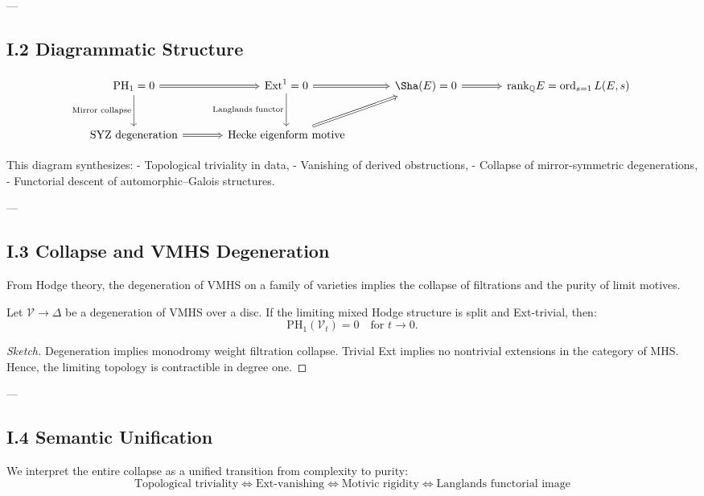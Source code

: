 ---

\subsection*{I.2 Diagrammatic Structure}

\[
\begin{tikzcd}[row sep=large, column sep=large]
\mathrm{PH}_1 = 0 \arrow[r, Rightarrow] \arrow[d, "\text{Mirror collapse}"'] &
\mathrm{Ext}^1 = 0 \arrow[r, Rightarrow] \arrow[d, "\text{Langlands functor}"'] &
\Sha(E) = 0 \arrow[r, Rightarrow] &
\mathrm{rank}_{\mathbb{Q}} E = \operatorname{ord}_{s=1} L(E,s) \\
\text{SYZ degeneration} \arrow[r, Rightarrow] &
\text{Hecke eigenform motive} \arrow[ur, Rightarrow] &
\end{tikzcd}
\]

This diagram synthesizes:
- Topological triviality in data,
- Vanishing of derived obstructions,
- Collapse of mirror-symmetric degenerations,
- Functorial descent of automorphic–Galois structures.

---

\subsection*{I.3 Collapse and VMHS Degeneration}

From Hodge theory, the degeneration of VMHS on a family of varieties  
implies the collapse of filtrations and the purity of limit motives.

\begin{proposition}
Let \( \mathcal{V} \to \Delta \) be a degeneration of VMHS over a disc.  
If the limiting mixed Hodge structure is split and Ext-trivial, then:
\[
\mathrm{PH}_1(\mathcal{V}_t) = 0 \quad \text{for } t \to 0.
\]
\end{proposition}

\begin{proof}[Sketch]
Degeneration implies monodromy weight filtration collapse.  
Trivial Ext implies no nontrivial extensions in the category of MHS.  
Hence, the limiting topology is contractible in degree one.
\end{proof}

---

\subsection*{I.4 Semantic Unification}

We interpret the entire collapse as a unified transition from complexity to purity:
\[
\boxed{
\text{Topological triviality} \Leftrightarrow \text{Ext-vanishing} \Leftrightarrow \text{Motivic rigidity} \Leftrightarrow \text{Langlands functorial image}
}
\]

